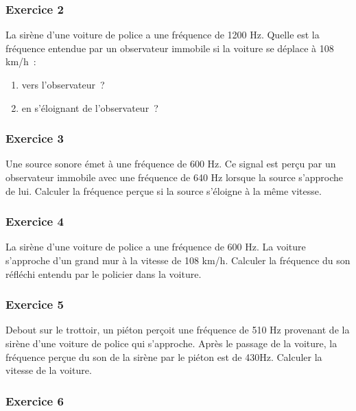 \subsubsection{Exercice 2} %

La sirène d'une voiture de police a une fréquence de 1200 Hz. Quelle est
la fréquence entendue par un observateur immobile si la voiture se
déplace à 108 km/h~:
\begin{enumerate}
	\item vers l'observateur~?
	\item en s'éloignant de l'observateur~?
\end{enumerate}

\subsubsection{Exercice 3} %

Une source sonore émet à une fréquence de 600 Hz. Ce signal est perçu par
un observateur immobile avec une fréquence de 640 Hz lorsque la source
s'approche de lui. Calculer la fréquence perçue si la source s'éloigne à
la même vitesse.

\subsubsection{Exercice 4} %

La sirène d'une voiture de police a une fréquence de 600 Hz. La voiture
s'approche d'un grand mur à la vitesse de 108 km/h. Calculer la
fréquence du son réfléchi entendu par le policier dans la voiture.

\subsubsection{Exercice 5} %

Debout sur le trottoir, un piéton perçoit une fréquence de 510 Hz
provenant de la sirène d'une voiture de police qui s'approche. Après le
passage de la voiture, la fréquence perçue du son de la sirène par le
piéton est de 430Hz. Calculer la vitesse de la voiture.

\subsubsection{Exercice 6 }

